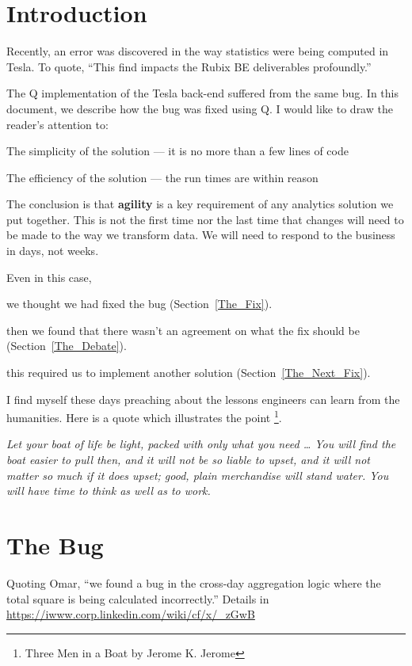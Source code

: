 \usepackage{hyperref}

\section{Introduction}

Recently, an error was discovered in the way statistics were being
computed in Tesla. To quote, ``This find impacts the Rubix BE
deliverables profoundly.''

The Q implementation of the Tesla back-end suffered from the same bug.
In this document, we describe how the bug was fixed using Q.
I would like to draw the reader's attention to:
\be
\item The simplicity of the solution --- it is no more than a few lines
of code
\item The efficiency of the solution --- the run times are within reason
\ee

The conclusion is that {\bf agility } is a key requirement of any analytics
solution we put together. 
This is not the first time nor the last time that changes will need 
to be made to the way we transform data. 
We will need to respond to the business in
days, not weeks. 

Even in this case, 
\bi
\item we thought we had fixed the bug
(Section~\ref{The_Fix}). 
\item then we found that there wasn't an
agreement on what the fix should be (Section~\ref{The_Debate}). 
\item this  required us to implement
another solution (Section~\ref{The_Next_Fix}).
\ei

I find myself these days preaching about the lessons engineers can learn
from the humanities. Here is a quote which illustrates the point
\footnote{Three Men in a Boat by Jerome K. Jerome}.

{\it 
Let your boat of life be light, packed with only what you need \ldots 
You will find the boat easier to pull then, and it will not be so
liable to upset, and it will not matter so much if it does upset;
good, plain merchandise will stand water. You will have time to think
as well as to work.
}

\section{The Bug}
\label{The_Bug}

Quoting Omar, ``we found a bug in the cross-day aggregation logic where 
the total square is being calculated incorrectly.'' Details in
\url{https://iwww.corp.linkedin.com/wiki/cf/x/_zGwB}

